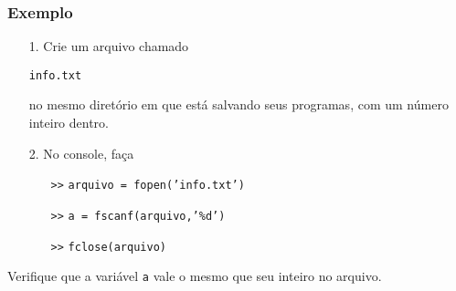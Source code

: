 \documentclass{beamer}
\newcommand{\code}[1]{{\texttt{#1}}}
\newcommand{\acode}[1]{\alert{\texttt{#1}}}
\newcommand{\ac}{\alert{\texttt{>>}}}
\begin{document}
\begin{frame}
   \frametitle{Exemplo}
   \begin{itemize}
      \item[1.] Crie um arquivo chamado
      \begin{center}
         \code{info.txt}
      \end{center}
      no mesmo diretório em que está salvando seus programas, com um número inteiro dentro.
      \item[2.] No console, faça
      \begin{itemize}
         \item[\ac] \code{arquivo = \acode{fopen}('info.txt')}
         \item[\ac] \code{a = \acode{fscanf}(arquivo,'\%d')}
         \item[\ac] \code{\acode{fclose}(arquivo)}
      \end{itemize}
   \end{itemize}

   Verifique que a variável \alert{\code{a}} vale o mesmo que seu inteiro no arquivo.
\end{frame}
\end{document}

